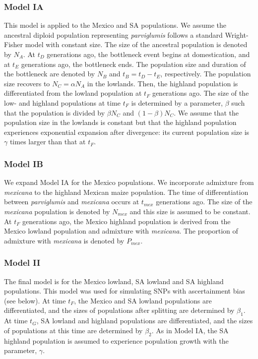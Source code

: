 \subsubsection{Model IA}
This model is applied to the Mexico and SA populations.
We assume the ancestral diploid population representing \emph{parviglumis} follows a standard Wright-Fisher model with constant size.  The size of the ancestral population is denoted by $N_A$.
At $t_D$ generations ago, the bottleneck event begins at domestication, and at $t_E$ generations ago, the bottleneck ends.  The population size and duration of the bottleneck are denoted by $N_B$ and $t_B=t_D-t_E$, respectively.  The population size recovers to $N_C=\alpha N_A$ in the lowlands.  
Then, the highland population is differentiated from the lowland population at $t_F$ generations ago.  The size of the low- and highland populations at time $t_F$ is determined by a parameter, $\beta$ such that the population is divided by $\beta N_C$ and $(1-\beta)N_C$.  
We assume that the population size in the lowlands is constant but that the highland population experiences exponential expansion after divergence: its current population size is $\gamma$ times larger than that at $t_F$.  \\

\subsubsection{Model IB}
We expand Model IA for the Mexico populations.  We incorporate admixture from \emph{mexicana} to the highland Mexican maize population.  The time of differentiation between \emph{parviglumis} and \emph{mexicana} occurs at $t_{mex}$ generations ago.  The size of the \emph{mexicana} population is denoted by $N_{mex}$ and this size is assumed to be constant.  At $t_F$ generations ago, the Mexico highland population is derived from the Mexico lowland population and admixture with \emph{mexicana}.  The proportion of admixture with \emph{mexicana} is denoted by $P_{mex}$.  \\

\subsubsection{Model II}
The final model is for the Mexico lowland, SA lowland and SA highland populations.  This model was used for simulating SNPs with ascertainment bias (see below).  At time $t_F$, the Mexico and SA lowland populations are differentiated, and the sizes of populations after splitting are determined by $\beta_1$.  At time $t_G$, SA lowland and highland populations are differentiated, and the sizes of populations at this time are determined by $\beta_2$.  As in Model IA, the SA highland population is assumed to experience population growth with the parameter, $\gamma$.\\

